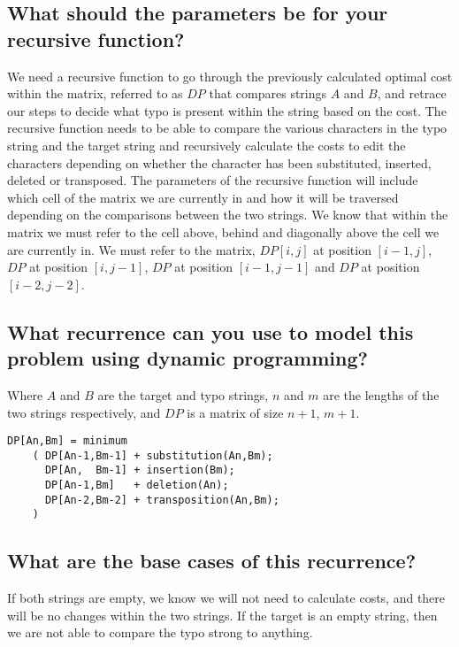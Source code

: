 \documentclass[letterpaper,12pt]{article}
\begin{document}
\subsection{What should the parameters be for your recursive function?}
We need a recursive function to go through the previously calculated optimal cost within the matrix, referred to as $DP$ that compares strings $A$ and $B$, and retrace our steps to decide what typo is present within the string based on the cost. The recursive function needs to be able to compare the various characters in the typo string and the target string and recursively calculate the costs to edit the characters depending on whether the character has been substituted, inserted, deleted or transposed. The parameters of the recursive function will include which cell of the matrix we are currently in and how it will be traversed depending on the comparisons between the two strings. We know that within the matrix we must refer to the cell above, behind and diagonally above the cell we are currently in. We must refer to the matrix, $DP[i,j]$ at position $[i-1, j]$, $DP$ at position $[i, j-1]$, $DP$ at position $[i-1, j-1]$ and $DP$ at position $[i-2, j-2]$.

\subsection{What recurrence can you use to model this problem using dynamic programming?}
Where $A$ and $B$ are the target and typo strings, $n$ and $m$ are the lengths of the two strings respectively, and $DP$ is a matrix of size $n+1$, $m+1$. 
\newline
\begin{lstlisting}
DP[An,Bm] = minimum
	( DP[An-1,Bm-1] + substitution(An,Bm);
	  DP[An,  Bm-1] + insertion(Bm);
	  DP[An-1,Bm]   + deletion(An);
	  DP[An-2,Bm-2] + transposition(An,Bm);
	)
\end{lstlisting}

\subsection{What are the base cases of this recurrence?}
If both strings are empty, we know we will not need to calculate costs, and there will be no changes within the two strings. If the target is an empty string, then we are not able to compare the typo strong to anything. 
\end{document}
